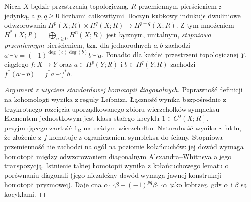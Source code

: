 \begin{twierdzenie}
Niech $X$ będzie przestrzenią topologiczną, $R$ przemiennym
pierścieniem z jedynką, a $p,q\geq0$ liczbami całkowitymi.
Iloczyn kubkowy indukuje dwuliniowe odwzorowania
$H^p(X;R)\times H^q(X;R)\to H^{p+q}(X;R)$.
Z tym mnożeniem $H^*(X;R)=\bigoplus_{n\geq0}H^n(X;R)$ jest
łącznym, unitalnym, \emph{stopniowo przemiennym} pierścieniem,
tzn. dla jednorodnych $a,b$ zachodzi
$a\smile b=(-1)^{\deg(a)\deg(b)}b\smile a$.
Ponadto dla każdej przestrzeni topologicznej $Y$, ciągłego
$f:X\to Y$ oraz $a\in H^p(Y;R)$ i $b\in H^q(Y;R)$ zachodzi
$f^*(a\smile b)=f^*a\smile f^*b$.
\end{twierdzenie}
\begin{proof}[Argument z użyciem standardowej homotopii diagonalnych]
Poprawność definicji na kohomologii wynika z reguły Leibniza.
Łączność wynika bezpośrednio z trzykrotnego rozcięcia
uporządkowanego zbioru wierzchołków sympleksu.
Elementem jednostkowym jest klasa stałego kocyklu
$1\in C^0(X;R)$, przyjmującego wartość $1_R$ na każdym
wierzchołku. Naturalność wynika z faktu, że złożenie z $f$
komutuje z ograniczeniem sympleksu do ściany.
Stopniowa przemienność nie zachodzi na ogół na poziomie
kołańcuchów: jej dowód wymaga homotopii między
odwzorowaniem diagonalnym Alexandra--Whitneya a jego
transpozycją. Istnienie takiej homotopii wynika z kołańcuchowego lematu
o porównaniu diagonali (jego niezależny dowód wymaga jawnej
konstrukcji homotopii pryzmowej). Daje ona
$\alpha\smile\beta-(-1)^{pq}\beta\smile\alpha$ jako kobrzeg,
gdy $\alpha$ i $\beta$ są kocyklami.
\end{proof}

